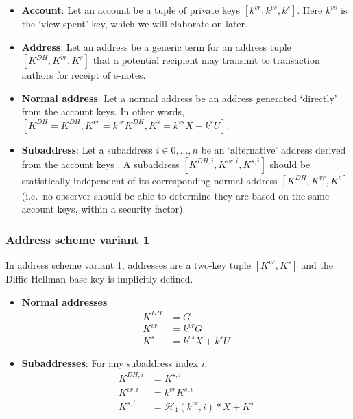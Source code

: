 \begin{itemize}
    \item \textbf{Account}: Let an account be a tuple of private keys $[k^{vr}, k^{vs}, k^s]$. Here $k^{vs}$ is the `view-spent' key, which we will elaborate on later.

    \item \textbf{Address}: Let an address be a generic term for an address tuple $[K^{DH}, K^{vr}, K^s]$ that a potential recipient may transmit to transaction authors for receipt of e-notes.

    \item \textbf{Normal address}: Let a normal address be an address generated `directly' from the account keys. In other words, $[K^{DH} = K^{DH}, K^{vr} = k^{vr} K^{DH}, K^s = k^{vs} X + k^s U]$.

    \item \textbf{Subaddress}: Let a subaddress $i \in 0,...,n$ be an `alternative' address derived from the account keys \cite{MRL-0006-subaddresses, subaddress-pull-request}. A subaddress $[K^{DH,i}, K^{vr,i}, K^{s,i}]$ should be statistically independent of its corresponding normal address $[K^{DH}, K^{vr}, K^s]$ (i.e.\ no observer should be able to determine they are based on the same account keys, within a security factor).
\end{itemize}

\subsubsection{Address scheme variant 1}

In address scheme variant 1, addresses are a two-key tuple $[K^{vr}, K^s]$ and the Diffie-Hellman base key is implicitly defined.

\begin{itemize}
    \item \textbf{Normal addresses}
    \begin{align*}
        K^{DH} &= G  \\
        K^{vr} &= k^{vr} G  \\
        K^{s} &= k^{vs} X + k^s U
    \end{align*}

    \item \textbf{Subaddresses}: For any subaddress index $i$.\vspace{.115cm}
    \begin{align*}
        K^{DH,i} &= K^{s,i}  \\
        K^{vr,i} &= k^{vr} K^{s,i}  \\
        K^{s,i} &= \mathcal{H}_4(k^{vr},i)*X + K^s
    \end{align*}
\end{itemize}

